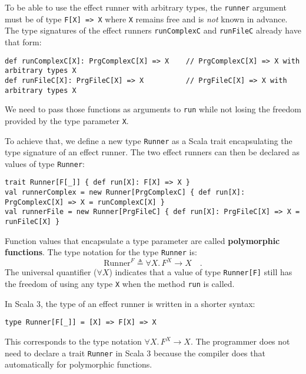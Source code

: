 To be able to use the effect runner with arbitrary types, the \lstinline!runner!
argument must be of type \lstinline!F[X] => X!
where \lstinline!X! remains
free and is \emph{not} known in advance. The type signatures of the
effect runners \lstinline!runComplexC!
and \lstinline!runFileC!
already have that form:
\begin{lstlisting}
def runComplexC[X]: PrgComplexC[X] => X    // PrgComplexC[X] => X with arbitrary types X
def runFileC[X]: PrgFileC[X] => X          // PrgFileC[X] => X with arbitrary types X
\end{lstlisting}
We need to pass those functions as arguments to \lstinline!run!
while not losing the freedom provided by the type parameter \lstinline!X!. 

To achieve that, we define a new type \lstinline!Runner!
as a Scala trait encapsulating the type signature of an effect runner.
The two effect runners can then be declared as values of type \lstinline!Runner!:
\begin{lstlisting}
trait Runner[F[_]] { def run[X]: F[X] => X }
val runnerComplex = new Runner[PrgComplexC] { def run[X]: PrgComplexC[X] => X = runComplexC[X] }
val runnerFile = new Runner[PrgFileC] { def run[X]: PrgFileC[X] => X = runFileC[X] } 
\end{lstlisting}
Function values that encapsulate a type parameter are called \textbf{polymorphic
functions}. The type notation for the
type \lstinline!Runner!
is:
\[
\text{Runner}^{F}\triangleq\forall X.\,F^{X}\rightarrow X\quad.
\]
The universal quantifier ($\forall X$) indicates that a value of
type \lstinline!Runner[F]!
still has the freedom of using any type \lstinline!X!
when the method \lstinline!run!
is called.

In Scala 3, the type of an effect runner is written in a shorter syntax:
\begin{lstlisting}
type Runner[F[_]] = [X] => F[X] => X
\end{lstlisting}
This corresponds to the type notation $\forall X.\,F^{X}\rightarrow X$.
The programmer does not need to declare a trait \lstinline!Runner!
in Scala 3 because the compiler does that automatically for polymorphic
functions.

